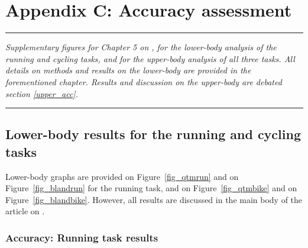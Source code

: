 \FloatBarrier
\chapter{Appendix C: Accuracy assessment}
\label{Ann:2}


\begin{center}
\rule{0.7\linewidth}{.5pt}
\begin{minipage}{0.7\linewidth}
\smallskip

\textit{
Supplementary figures for Chapter 5 on , for the lower-body analysis of the running and cycling tasks, and for the upper-body analysis of all three tasks. \newline\newline All details on methods and results on the lower-body are provided in the forementioned chapter. Results and discussion on the upper-body are debated section \ref{upper_acc}.
}

\end{minipage}
\smallskip
\rule{0.7\linewidth}{.5pt}
\end{center}

\minitoc
\newpage

\section{Lower-body results for the running and cycling tasks}

Lower-body graphs are provided on Figure~\ref{fig_qtmrun} and on Figure~\ref{fig_blandrun} for the running task, and on Figure~\ref{fig_qtmbike} and on Figure~\ref{fig_blandbike}. However, all results are discussed in the main body of the article on .

\subsection{Accuracy: Running task results}

